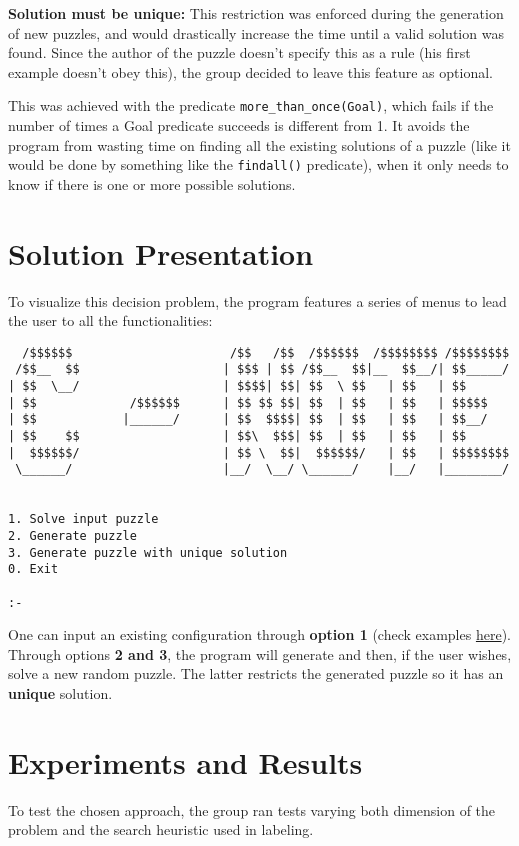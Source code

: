 \documentclass[runningheads]{llncs}
\begin{document}
\textbf{Solution must be unique:} This restriction was enforced during the generation of new puzzles, and would drastically increase the time until a valid solution was found. Since the author of the puzzle doesn't specify this as a rule (his first example doesn't obey this), the group decided to leave this feature as optional.

This was achieved with the predicate \verb!more_than_once(Goal)!, \cite{ref-more} which fails if the number of times a Goal predicate succeeds is different from 1. It avoids the program from wasting time on finding all the existing solutions of a puzzle (like it would be done by something like the \verb!findall()! predicate), when it only needs to know if there is one or more possible solutions.

\newpage
\section{Solution Presentation}
To visualize this decision problem, the program features a series of menus to lead the user to all the functionalities:
\begin{verbatim}
  /$$$$$$                      /$$   /$$  /$$$$$$  /$$$$$$$$ /$$$$$$$$
 /$$__  $$                    | $$$ | $$ /$$__  $$|__  $$__/| $$_____/
| $$  \__/                    | $$$$| $$| $$  \ $$   | $$   | $$      
| $$             /$$$$$$      | $$ $$ $$| $$  | $$   | $$   | $$$$$   
| $$            |______/      | $$  $$$$| $$  | $$   | $$   | $$__/   
| $$    $$                    | $$\  $$$| $$  | $$   | $$   | $$      
|  $$$$$$/                    | $$ \  $$|  $$$$$$/   | $$   | $$$$$$$$
 \______/                     |__/  \__/ \______/    |__/   |________/


1. Solve input puzzle
2. Generate puzzle
3. Generate puzzle with unique solution
0. Exit

:- 
\end{verbatim}

One can input an existing configuration through \textbf{option 1} (check examples \href{https://erich-friedman.github.io/puzzle/100/}{here}).
Through options \textbf{2 and 3}, the program will generate and then, if the user wishes, solve a new random puzzle. The latter restricts the generated puzzle so it has an \textbf{unique} solution.

\section{Experiments and Results}
To test the chosen approach, the group ran tests varying both dimension of the problem and the search heuristic used in labeling.
\end{document}
